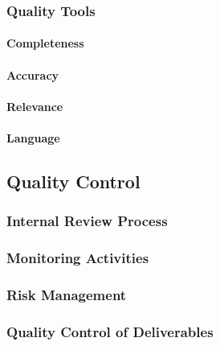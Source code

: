 \documentclass[
  11pt,
]{article}
\begin{document}
\hypertarget{quality-tools}{%
\subsubsection{Quality Tools}\label{quality-tools}}

\hypertarget{completeness}{%
\paragraph{Completeness}\label{completeness}}

\hypertarget{accuracy}{%
\paragraph{Accuracy}\label{accuracy}}

\hypertarget{relevance}{%
\paragraph{Relevance}\label{relevance}}

\hypertarget{language}{%
\paragraph{Language}\label{language}}

\hypertarget{quality-control-1}{%
\subsection{Quality Control}\label{quality-control-1}}

\hypertarget{internal-review-process}{%
\subsubsection{Internal Review Process}\label{internal-review-process}}

\hypertarget{monitoring-activities}{%
\subsubsection{Monitoring Activities}\label{monitoring-activities}}

\hypertarget{risk-management}{%
\subsubsection{Risk Management}\label{risk-management}}

\hypertarget{quality-control-of-deliverables}{%
\subsubsection{Quality Control of
Deliverables}\label{quality-control-of-deliverables}}
\end{document}
